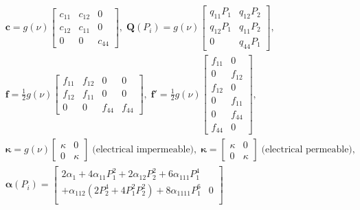 \begin{equation}
    \begin{split}
        &
        {\mathbf{c}}=g(\nu)\begin{bmatrix}
            c_{11} & c_{12} & 0 \\
            c_{12} & c_{11} & 0 \\
            0 & 0 & c_{44}
        \end{bmatrix},\;
        {\mathbf{Q}(P_i)}=g(\nu)\begin{bmatrix}
            q_{11}P_1 & q_{12}P_2 \\
            q_{12}P_1 & q_{11}P_2 \\
            0 &  q_{44}P_1
        \end{bmatrix},\;\\
        &
        {\mathbf{f}}=\frac{1}{2}g(\nu)\begin{bmatrix}
            f_{11} & f_{12} & 0 & 0 \\
            f_{12} & f_{11} & 0 & 0 \\
            0 & 0 & f_{44} & f_{44}
        \end{bmatrix}, \;
        {\mathbf{f}'}=\frac{1}{2}g(\nu)\begin{bmatrix}
            f_{11} & 0 \\
            0 & f_{12} \\
            f_{12} & 0 \\
            0 & f_{11} \\
            0 & f_{44} \\
            f_{44} & 0
        \end{bmatrix},\\
        &
        {\mathbf{\kappa}}=g(\nu)\begin{bmatrix}
            \kappa & 0 \\
            0 & \kappa
        \end{bmatrix}\; \text{(electrical impermeable)},\;
        {\mathbf{\kappa}}=\begin{bmatrix}
            \kappa & 0 \\
            0 & \kappa
        \end{bmatrix}\; \text{(electrical permeable)},\; \\
        &
        \mathbf{\alpha}(P_i)=\begin{bmatrix}
             2\alpha_1+4\alpha_{11}P_1^2+2\alpha_{12}P_2^2+6\alpha_{111}P_1^4 & {}\\
             +\alpha_{112}(2P_2^4+4P_1^2P_2^2)+8\alpha_{1111}P_1^6  & 0\\

\end{bmatrix}
\end{split}
\end{equation}
